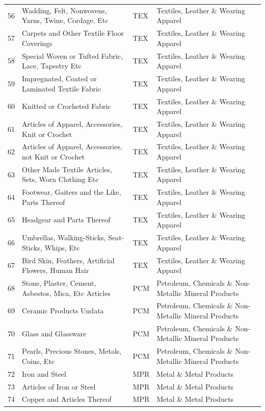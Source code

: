 \documentclass[a4paper]{article}
\begin{document}
\begin{table}[ht]
{\begin{tabular}{rlll}
  56 & Wadding, Felt, Nonwovens, Yarns, Twine, Cordage, Etc & TEX & Textiles, Leather \& Wearing Apparel \\ 
  57 & Carpets and Other Textile Floor Coverings & TEX & Textiles, Leather \& Wearing Apparel \\ 
  58 & Special Woven or Tufted Fabric, Lace, Tapestry Etc & TEX & Textiles, Leather \& Wearing Apparel \\ 
  59 & Impregnated, Coated or Laminated Textile Fabric & TEX & Textiles, Leather \& Wearing Apparel \\ 
  60 & Knitted or Crocheted Fabric & TEX & Textiles, Leather \& Wearing Apparel \\ 
  61 & Articles of Apparel, Accessories, Knit or Crochet & TEX & Textiles, Leather \& Wearing Apparel \\ 
  62 & Articles of Apparel, Accessories, not Knit or Crochet & TEX & Textiles, Leather \& Wearing Apparel \\ 
  63 & Other Made Textile Articles, Sets, Worn Clothing Etc & TEX & Textiles, Leather \& Wearing Apparel \\ 
  64 & Footwear, Gaiters and the Like, Parts Thereof & TEX & Textiles, Leather \& Wearing Apparel \\ 
  65 & Headgear and Parts Thereof & TEX & Textiles, Leather \& Wearing Apparel \\ 
  66 & Umbrellas, Walking-Sticks, Seat-Sticks, Whips, Etc & TEX & Textiles, Leather \& Wearing Apparel \\ 
  67 & Bird Skin, Feathers, Artificial Flowers, Human Hair & TEX & Textiles, Leather \& Wearing Apparel \\ 
  68 & Stone, Plaster, Cement, Asbestos, Mica, Etc Articles & PCM & Petroleum, Chemicals \& Non-Metallic Mineral Products \\ 
  69 & Ceramic Products Undata & PCM & Petroleum, Chemicals \& Non-Metallic Mineral Products \\ 
  70 & Glass and Glassware & PCM & Petroleum, Chemicals \& Non-Metallic Mineral Products \\ 
  71 & Pearls, Precious Stones, Metals, Coins, Etc & PCM & Petroleum, Chemicals \& Non-Metallic Mineral Products \\ 
  72 & Iron and Steel & MPR & Metal \& Metal Products \\ 
  73 & Articles of Iron or Steel & MPR & Metal \& Metal Products \\ 
  74 & Copper and Articles Thereof & MPR & Metal \& Metal Products \\ 

\end{tabular}}
\end{table}
\end{document}
